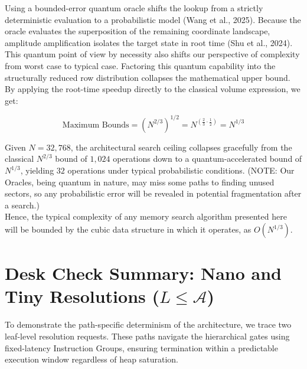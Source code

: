\documentclass[11pt]{article}
\begin{document}
Using a bounded-error quantum oracle shifts the lookup from a strictly deterministic evaluation to a probabilistic model (Wang et al., 2025). Because the oracle evaluates the superposition of the remaining coordinate landscape, amplitude amplification isolates the target state in root time (Shu et al., 2024).\\

This quantum point of view by necessity also shifts our perspective of complexity from worst case to typical case. Factoring this quantum capability into the structurally reduced row distribution collapses the mathematical upper bound. By applying the root-time speedup directly to the classical volume expression, we get:

\begin{equation*}
    \text{Maximum Bounds} = \left( N^{2/3} \right)^{1/2} = N^{\left(\frac{2}{3} \cdot \frac{1}{2}\right)} = N^{1/3}
\end{equation*}

Given $N = 32,768$, the architectural search ceiling collapses gracefully from the classical $N^{2/3}$ bound of $1,024$ operations down to a quantum-accelerated bound of $N^{1/3}$, yielding $32$ operations under typical probabilistic conditions. (NOTE: Our Oracles, being quantum in nature, may miss some paths to finding unused sectors, so any probabilistic error will be revealed in potential fragmentation after a search.)\\

Hence, the typical complexity of any memory search algorithm presented here will be bounded by the cubic data structure in which it operates, as $O(N^{1/3})$.

\section{Desk Check Summary: Nano and Tiny Resolutions ($L \le \mathcal{A}$)}

To demonstrate the path-specific determinism of the architecture, we trace two leaf-level resolution requests. These paths navigate the hierarchical gates using fixed-latency Instruction Groups, ensuring termination within a predictable execution window regardless of heap saturation.
\end{document}

